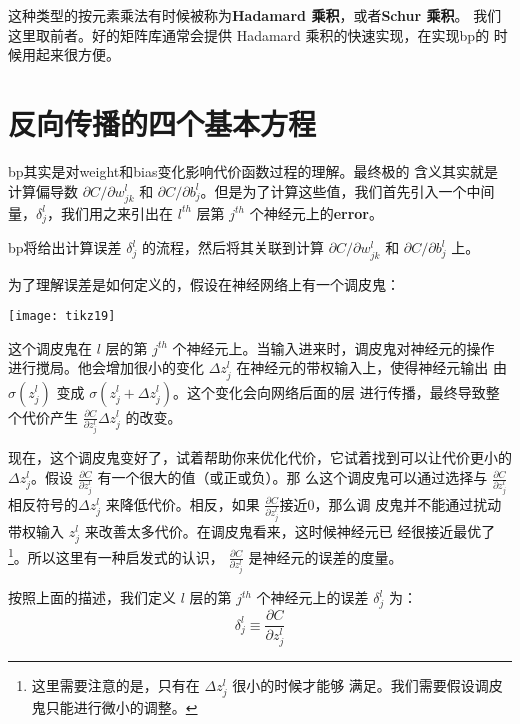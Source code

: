 这种类型的按元素乘法有时候被称为\textbf{Hadamard 乘积}，或者\textbf{Schur 乘积}。
我们这里取前者。好的矩阵库通常会提供 Hadamard 乘积的快速实现，在实现\gls*{bp}的
时候用起来很方便。

\section{反向传播的四个基本方程}
\label{sec:the_four_fundamental_equations_behind_backpropagation}

\gls*{bp}其实是对\gls*{weight}和\gls*{bias}变化影响代价函数过程的理解。最终极的
含义其实就是计算偏导数 $\partial C/\partial w_{jk}^l$ 和 $\partial C/\partial
b_j^l$。但是为了计算这些值，我们首先引入一个中间量，$\delta_j^l$，我们用之来引出在
$l^{th}$ 层第 $j^{th}$ 个神经元上的\textbf{\gls{error}}。

\gls*{bp}将给出计算误差 $\delta_j^l$ 的流程，然后将其关联到计算 $\partial
C/\partial w_{jk}^l$ 和 $\partial C/\partial b_j^l$ 上。

为了理解误差是如何定义的，假设在神经网络上有一个调皮鬼：

\begin{center}
  \texttt{[image: tikz19]}
\end{center}

这个调皮鬼在 $l$ 层的第 $j^{th}$ 个神经元上。当输入进来时，调皮鬼对神经元的操作
进行搅局。他会增加很小的变化 $\Delta z_j^l$ 在神经元的带权输入上，使得神经元输出
由 $\sigma(z_j^l)$ 变成 $\sigma(z_j^l + \Delta z_j^l)$。这个变化会向网络后面的层
进行传播，最终导致整个代价产生 $\frac{\partial C}{\partial z_j^l} \Delta z_j^l$
的改变。

现在，这个调皮鬼变好了，试着帮助你来优化代价，它试着找到可以让代价更小的$\Delta
z_j^l$。假设 $\frac{\partial C}{\partial z_j^l}$ 有一个很大的值（或正或负）。那
么这个调皮鬼可以通过选择与 $\frac{\partial C}{\partial z_j^l}$ 相反符号的$\Delta
z_j^l$ 来降低代价。相反，如果 $\frac{\partial C}{\partial z_j^l}$接近$0$，那么调
皮鬼并不能通过扰动带权输入 $z_j^l$ 来改善太多代价。在调皮鬼看来，这时候神经元已
经很接近最优了\footnote{这里需要注意的是，只有在 $\Delta z_j^l$ 很小的时候才能够
  满足。我们需要假设调皮鬼只能进行微小的调整。}。所以这里有一种启发式的认识，
$\frac{\partial C}{\partial z_j^l}$ 是神经元的误差的度量。

按照上面的描述，我们定义 $l$ 层的第 $j^{th}$ 个神经元上的误差 $\delta_j^l$ 为：
\begin{equation}
  \delta^l_j \equiv \frac{\partial C}{\partial z^l_j}
  \label{eq:29}\tag{29}
\end{equation}

